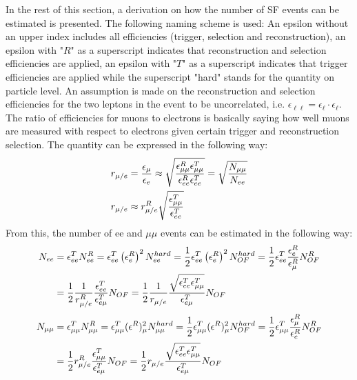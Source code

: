 In the rest of this section, a derivation on how the number of SF events can be estimated is presented. 
The following naming scheme is used: 
An epsilon without an upper index includes all efficiencies (trigger, selection and reconstruction), an epsilon with "$R$" as a superscript indicates that reconstruction and selection efficiencies are applied, an epsilon with "$T$" as a superscript indicates that trigger efficiencies are applied while the superscript "hard" stands for the quantity on particle level.
An assumption is made on the reconstruction and selection efficiencies for the two leptons in the event to be uncorrelated, i.e. $\epsilon_{\ell\ell}=\epsilon_{\ell} \cdot \epsilon_{\ell}$. 
The ratio of efficiencies for muons to electrons is basically saying how well muons are measured with respect to electrons given certain trigger and reconstruction selection. 
The quantity can be expressed in the following way:
\begin{align}
\label{eq:rMue}
r_{\mu/e} & = \frac{\epsilon_{\mu}}{\epsilon_{e}} \approx \sqrt{ \frac{\epsilon^{R}_{\mu\mu}\epsilon^{T}_{\mu\mu}}{\epsilon^{R}_{ee}\epsilon^{T}_{ee}}} = \sqrt{ \frac{N_{\mu\mu}}{N_{ee}}} \notag \\
r_{\mu/e} & \approx r^{R}_{\mu/e}\sqrt{ \frac{\epsilon^{T}_{\mu\mu}}{\epsilon^{T}_{ee}}}
\end{align}
From this, the number of ee and $\mu\mu$ events can be estimated in the following way:
\begin{align}
\label{eq:eeFormula}
N_{ee} & = \epsilon^{T}_{ee} N^{R}_{ee} = \epsilon^{T}_{ee} \left(\epsilon^{R}_{e}\right)^{2} N^{hard}_{ee} = \frac{1}{2} \epsilon^{T}_{ee} \left(\epsilon^{R}_{e}\right)^{2} N^{hard}_{OF} 
										= \frac{1}{2} \epsilon^{T}_{ee} \frac{\epsilon^{R}_{e}}{\epsilon^{R}_{\mu}} N^{R}_{OF} \notag \\
       & =\frac{1}{2} \frac{1}{r^{R}_{\mu/e}} \frac{\epsilon^{T}_{ee}}{\epsilon^{T}_{e\mu}}N_{OF} 
										= \frac{1}{2} \frac{1}{r_{\mu/e}} \frac{\sqrt{\epsilon^{T}_{ee}\epsilon^{T}_{\mu\mu}}}{\epsilon^{T}_{e\mu}} N_{OF}  \notag \\
\end{align}
\begin{align}
\label{eq:mumuFormula}
N_{\mu\mu} & = \epsilon^{T}_{\mu\mu} N^{R}_{\mu\mu} = \epsilon^{T}_{\mu\mu} (\epsilon^{R})^{2}_{\mu} N^{hard}_{\mu\mu} = \frac{1}{2} \epsilon^{T}_{\mu\mu} (\epsilon^{R})^{2}_{\mu} N^{hard}_{OF}
										= \frac{1}{2} \epsilon^{T}_{\mu\mu} \frac{\epsilon^{R}_{\mu}}{\epsilon^{R}_{e}} N^{R}_{OF}  \notag \\
	  & =\frac{1}{2} r^{R}_{\mu/e} \frac{\epsilon^{T}_{\mu\mu}}{\epsilon^{T}_{e\mu}}N_{OF} = \frac{1}{2} r_{\mu/e} \frac{\sqrt{\epsilon^{T}_{ee}\epsilon^{T}_{\mu\mu}}}{\epsilon^{T}_{e\mu}} N_{OF}
\end{align}
